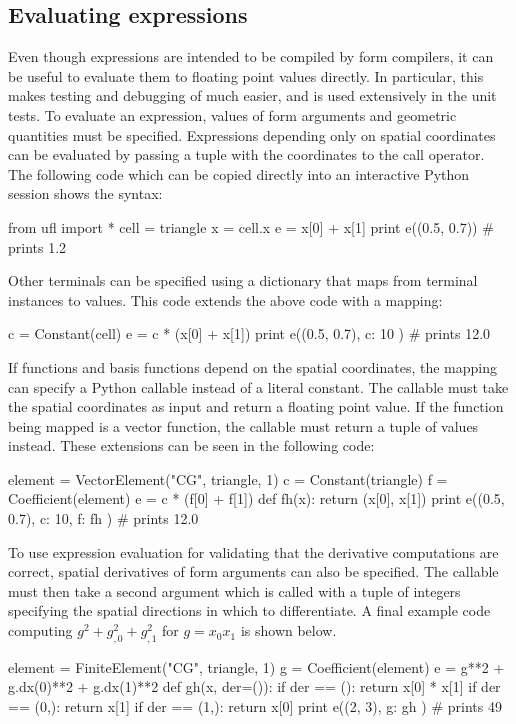 \subsection{Evaluating expressions}
\label{ufl:sec:evaluating}

Even though \ufl{} expressions are intended to be compiled by form
compilers, it can be useful to evaluate them to floating point values
directly. In particular, this makes testing and debugging of \ufl{}
much easier, and is used extensively in the unit tests.  To evaluate
an \ufl{} expression, values of form arguments and geometric
quantities must be specified.  Expressions depending only on spatial
coordinates can be evaluated by passing a tuple with the coordinates
to the call operator. The following code which can be copied directly
into an interactive Python session shows the syntax:
\begin{python}
from ufl import *
cell = triangle
x = cell.x
e = x[0] + x[1]
print e((0.5, 0.7)) # prints 1.2
\end{python}
Other terminals can be specified using a dictionary that maps from
terminal instances to values.  This code extends the above code with a
mapping:
\begin{python}
c = Constant(cell)
e = c * (x[0] + x[1])
print e((0.5, 0.7), { c: 10 }) # prints 12.0
\end{python}
If functions and basis functions depend on the spatial coordinates,
the mapping can specify a Python callable instead of a literal
constant.  The callable must take the spatial coordinates as input and
return a floating point value.  If the function being mapped is a
vector function, the callable must return a tuple of values instead.
These extensions can be seen in the following code:
\begin{python}
element = VectorElement("CG", triangle, 1)
c = Constant(triangle)
f = Coefficient(element)
e = c * (f[0] + f[1])
def fh(x):
    return (x[0], x[1])
print e((0.5, 0.7), { c: 10, f: fh }) # prints 12.0
\end{python}
To use expression evaluation for validating that the derivative
computations are correct, spatial derivatives of form arguments can
also be specified.  The callable must then take a second argument
which is called with a tuple of integers specifying the spatial
directions in which to differentiate. A final example code computing
$g^2 + g_{,0}^2 + g_{,1}^2$ for $g=x_0x_1$ is shown below.
\begin{python}
element = FiniteElement("CG", triangle, 1)
g = Coefficient(element)
e = g**2 + g.dx(0)**2 + g.dx(1)**2
def gh(x, der=()):
    if der == ():   return x[0] * x[1]
    if der == (0,): return x[1]
    if der == (1,): return x[0]
print e((2, 3), { g: gh }) # prints 49
\end{python}

